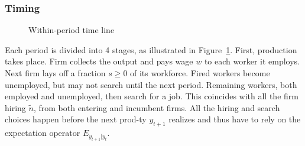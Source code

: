 \subsubsection*{Timing}
    \begin{figure}
        \centering
{}
\caption{Within-period time line} \label{fig:Timing}
\end{figure}

Each period is divided into 4 stages, as illustrated in Figure~\ref{fig:Timing}. First, production takes place. Firm collects the output and pays wage $w$ to each worker it employs. Next firm lays off a fraction $s\geq 0$ of its workforce. Fired workers become unemployed, but may not search until the next period. Remaining workers, both employed and unemployed, then search for a job. This coincides with all the firm hiring $\tilde{n}$, from both entering and incumbent firms. All the hiring and search choices happen before the next prod-ty $y_{t+1}$ realizes and thus have to rely on the expectation operator $E_{y_{t+1}|y_t}$.
